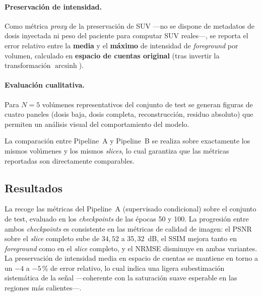 \paragraph{Preservación de intensidad.}
Como métrica \textit{proxy} de la preservación de SUV —no se
dispone de metadatos de dosis inyectada ni peso del paciente para
computar SUV reales—, se reporta el error relativo entre la
\textbf{media} y el \textbf{máximo} de intensidad de
\textit{foreground} por volumen, calculado en \textbf{espacio
de cuentas original} (tras invertir la transformación
$\operatorname{arcsinh}$).

\paragraph{Evaluación cualitativa.}
Para $N = 5$ volúmenes representativos del conjunto de test se
generan figuras de cuatro paneles (dosis baja, dosis completa,
reconstrucción, residuo absoluto) que permiten un análisis visual
del comportamiento del modelo.

La comparación entre Pipeline~A y Pipeline~B se realiza sobre
exactamente los mismos volúmenes y los mismos \textit{slices},
lo cual garantiza que las métricas reportadas son directamente
comparables.

\subsection{Resultados}
\label{sec:pet-resultados}

La  recoge las métricas del Pipeline~A
(supervisado condicional) sobre el conjunto de test, evaluado en
los \textit{checkpoints} de las épocas 50 y 100. La progresión
entre ambos \textit{checkpoints} es consistente en las métricas de
calidad de imagen: el PSNR sobre el \textit{slice} completo sube
de $34{,}52$ a $35{,}32$~dB, el SSIM mejora tanto en
\textit{foreground} como en el \textit{slice} completo, y el NRMSE
disminuye en ambas variantes. La preservación de intensidad media
en espacio de cuentas se mantiene en torno a un $-4$ a $-5$\,\% de
error relativo, lo cual indica una ligera subestimación
sistemática de la señal —coherente con la saturación suave
esperable en las regiones más calientes—.

